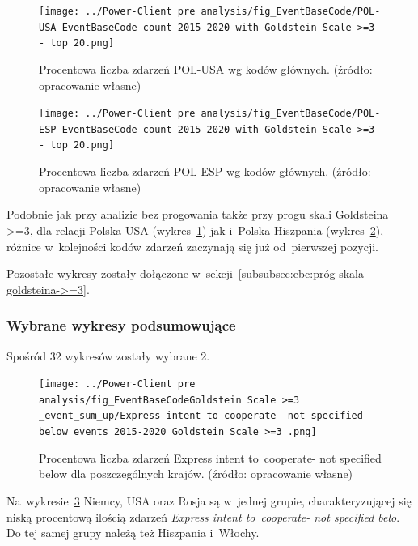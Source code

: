 \documentclass[11pt]{report}
\begin{document}
    \begin{figure}[tp]
        \centering
        \texttt{[image: ../Power-Client pre analysis/fig\_EventBaseCode/POL-USA EventBaseCode count 2015-2020 with Goldstein Scale >=3 - top 20.png]}
        \caption{Procentowa liczba zdarzeń POL-USA wg kodów głównych. (źródło: opracowanie własne)}
        \label{fig:Power-Client:EBC:Goldstein:POL-USA}
    \end{figure}

    \begin{figure}[tp]
        \centering
        \texttt{[image: ../Power-Client pre analysis/fig\_EventBaseCode/POL-ESP EventBaseCode count 2015-2020 with Goldstein Scale >=3 - top 20.png]}
        \caption{Procentowa liczba zdarzeń POL-ESP wg kodów głównych. (źródło: opracowanie własne)}
        \label{fig:Power-Client:EBC:Goldstein:POL-ESP}
    \end{figure}

    Podobnie jak przy analizie bez progowania także przy progu skali Goldsteina >=3, dla relacji Polska-USA (wykres~\ref{fig:Power-Client:EBC:Goldstein:POL-USA}) jak i~Polska-Hiszpania (wykres~\ref{fig:Power-Client:EBC:Goldstein:POL-ESP}),
    różnice w~kolejności kodów zdarzeń zaczynają się już od~pierwszej pozycji.

    Pozostałe wykresy zostały dołączone w~sekcji~\ref{subsubsec:ebc:próg-skala-goldsteina->=3}.

    \subsubsection{Wybrane wykresy podsumowujące}

    Spośród 32 wykresów zostały wybrane 2.

    \begin{figure}[tp]
        \centering
        \texttt{[image: ../Power-Client pre analysis/fig\_EventBaseCodeGoldstein Scale >=3 \_event\_sum\_up/Express intent to cooperate- not specified below events 2015-2020 Goldstein Scale >=3 .png]}
        \caption{Procentowa liczba zdarzeń Express intent to~cooperate- not specified below dla poszczególnych krajów. (źródło: opracowanie własne)}
        \label{fig:Power-Client:ERC:Goldstein:SumUp:Express intent to cooperate- not specified below}
    \end{figure}

    Na~wykresie~\ref{fig:Power-Client:ERC:Goldstein:SumUp:Express intent to cooperate- not specified below} Niemcy, USA oraz Rosja są w~jednej grupie,
    charakteryzującej się niską procentową ilością zdarzeń \textit{Express intent to~cooperate- not specified belo}.
    Do tej samej grupy należą też Hiszpania i~Włochy.
\end{document}
